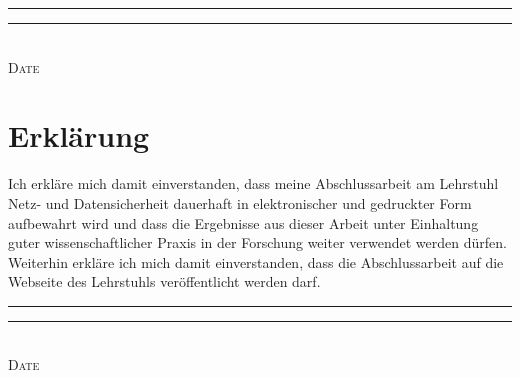 \makeatletter
\vspace{2cm}
\rule{4cm}{0.1pt} \hfill \rule{7cm}{0.1pt} \\
\hspace*{1.5cm} \textsc{Date} \hspace*{7cm} \textsc{\@author}
\makeatother

\cleardoublepage

\section*{Erklärung}
{
Ich erkläre mich damit einverstanden, dass meine Abschlussarbeit am
Lehrstuhl Netz- und Datensicherheit dauerhaft in elektronischer und gedruckter Form aufbewahrt
wird und dass die Ergebnisse aus dieser Arbeit unter Einhaltung guter
wissenschaftlicher Praxis in der Forschung weiter verwendet werden dürfen.\@}
Weiterhin erkläre ich mich damit einverstanden, dass die Abschlussarbeit auf die Webseite des Lehrstuhls veröffentlicht werden darf.

\makeatletter
\vspace{2cm}
\rule{4cm}{0.1pt} \hfill \rule{7cm}{0.1pt} \\
\hspace*{1.5cm} \textsc{Date} \hspace*{7cm} \textsc{\@author}
\makeatother

\cleardoublepage

\pagestyle{scrheadings} %

\tableofcontents

\cleardoublepage
